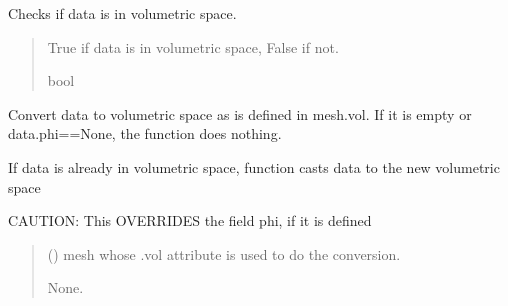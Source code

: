 \documentclass[letterpaper,10pt,english]{sphinxmanual}
\begin{document}
\begin{fulllineitems}
\begin{fulllineitems}
\label{\detokenize{_autosummary/nirfasterff.base.data.TPSFdata:nirfasterff.base.data.TPSFdata.isvol}}
\pysigstartsignatures
\pysiglinewithargsret
{}
{}
{}
\pysigstopsignatures
\sphinxAtStartPar
Checks if data is in volumetric space.
\begin{quote}\begin{description}
\sphinxAtStartPar
True if data is in volumetric space, False if not.

\sphinxAtStartPar
bool

\end{description}\end{quote}

\end{fulllineitems}


\begin{fulllineitems}
\label{\detokenize{_autosummary/nirfasterff.base.data.TPSFdata:nirfasterff.base.data.TPSFdata.togrid}}
\pysigstartsignatures
\pysiglinewithargsret
{}
{}
{}
\pysigstopsignatures
\sphinxAtStartPar
Convert data to volumetric space as is defined in mesh.vol. If it is empty or data.phi==None, the function does nothing.

\sphinxAtStartPar
If data is already in volumetric space, function casts data to the new volumetric space

\sphinxAtStartPar
CAUTION: This OVERRIDES the field phi, if it is defined
\begin{quote}\begin{description}
\sphinxAtStartPar
{} () \textendash{} mesh whose .vol attribute is used to do the conversion.

\sphinxAtStartPar
None.

\end{description}\end{quote}

\end{fulllineitems}



\end{fulllineitems}
\end{document}
